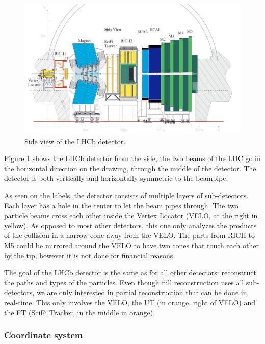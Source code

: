 \documentclass[12pt]{article}
\begin{document}
\begin{figure}[H]
	\includegraphics[width=\textwidth]{lhcb_geometry_upgrade}
	\caption{Side view of the LHCb detector. \cite{tracker_tdr}}
	\label{fig_lhcb_geometry}
\end{figure}

Figure \ref{fig_lhcb_geometry} shows the LHCb detector from the side, the two beams of the LHC go in the horizontal direction on the drawing, through the middle of the detector. The detector is both vertically and horizontally symmetric to the beampipe.

As seen on the labels, the detector consists of multiple layers of sub-detectors. Each layer has a hole in the center to let the beam pipes through. The two particle beams cross each other inside the Vertex Locator (VELO, at the right in yellow). As opposed to most other detectors, this one only analyzes the products of the collision in a narrow cone away from the VELO. The parts from RICH to M5 could be mirrored around the VELO to have two cones that touch each other by the tip, however it is not done for financial reasons.

The goal of the LHCb detector is the same as for all other detectors: reconstruct the paths and types of the particles. Even though full reconstruction uses all sub-detectors, we are only interested in partial reconstruction that can be done in real-time. This only involves the VELO, the UT (in orange, right of VELO) and the FT (SciFi Tracker, in the middle in orange).


\subsubsection{Coordinate system}\label{sec_coordinate_system}
\end{document}
